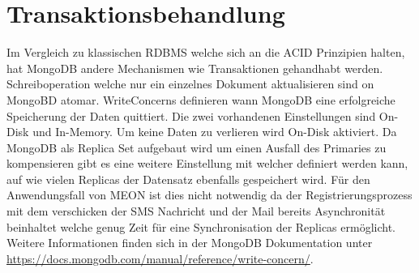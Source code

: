\section{Transaktionsbehandlung}
\label{transactions}
Im Vergleich zu klassischen \Gls{RDBMS} welche sich an die \Gls{ACID} Prinzipien halten, hat MongoDB andere Mechanismen wie Transaktionen gehandhabt werden. Schreiboperation welche nur ein einzelnes Dokument aktualisieren sind on MongoBD atomar. WriteConcerns definieren wann MongoDB eine erfolgreiche Speicherung der Daten quittiert. Die zwei vorhandenen Einstellungen sind On-Disk und In-Memory. Um keine Daten zu verlieren wird On-Disk aktiviert.\newline
Da MongoDB als Replica Set aufgebaut wird um einen Ausfall des Primaries zu kompensieren gibt es eine weitere Einstellung mit welcher definiert werden kann, auf wie vielen Replicas der Datensatz ebenfalls gespeichert wird. Für den Anwendungsfall von MEON ist dies nicht notwendig da der Registrierungsprozess mit dem verschicken der SMS Nachricht und der Mail bereits Asynchronität beinhaltet welche genug Zeit für eine Synchronisation der Replicas ermöglicht. Weitere Informationen finden sich in der MongoDB Dokumentation unter \url{https://docs.mongodb.com/manual/reference/write-concern/}.
